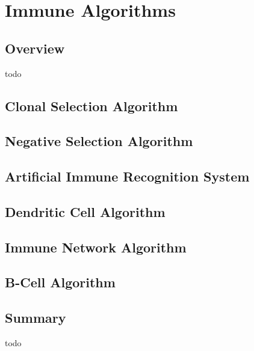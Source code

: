 


\chapter{Immune Algorithms}
\label{ch:immune}

\section{Overview}
todo



\section{Clonal Selection Algorithm}
\section{Negative Selection Algorithm}
\section{Artificial Immune Recognition System}
\section{Dendritic Cell Algorithm}
\section{Immune Network Algorithm}
\section{B-Cell Algorithm}

\section{Summary}
todo
